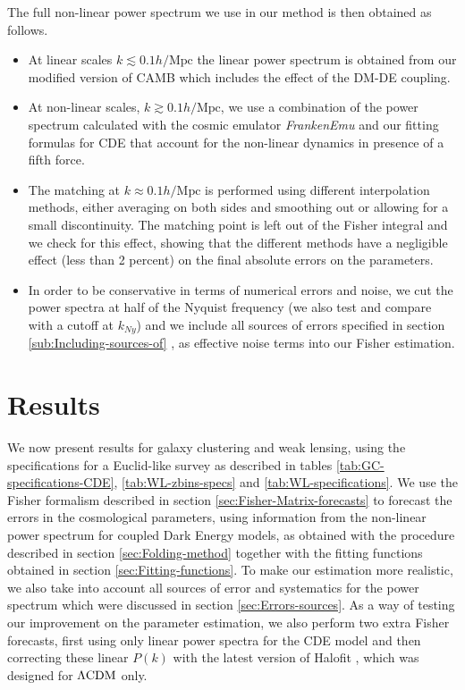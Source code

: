 The full non-linear power spectrum we use in our method is then obtained
as follows. 
\begin{itemize}
\item At linear scales $k\lesssim0.1h/\mbox{Mpc}$ the linear power spectrum
is obtained from our modified version of CAMB which includes the effect
of the DM-DE coupling. 
\item At non-linear scales, $k\gtrsim0.1h/\mbox{Mpc}$, we use a combination
of the power spectrum calculated with the cosmic emulator \emph{FrankenEmu
}and our fitting formulas for CDE that account for the non-linear
dynamics in presence of a fifth force. 
\item The matching at $k\approx0.1h/\mbox{Mpc}$ is performed using different
interpolation methods, either averaging on both sides and smoothing
out or allowing for a small discontinuity. The matching point is left
out of the Fisher integral and we check for this effect, showing that
the different methods have a negligible effect (less than 2 percent)
on the final absolute errors on the parameters. 
\item In order to be conservative in terms of numerical errors and noise,
we cut the power spectra at half of the Nyquist frequency (we also
test and compare with a cutoff at $k_{Ny}$) and we include all sources
of errors specified in section \ref{sub:Including-sources-of} , as
effective noise terms into our Fisher estimation. 
\end{itemize}

\section{\label{sec:GC-WL-Results}Results}

We now present results for galaxy clustering and weak lensing, using
the specifications for a Euclid-like survey as described in tables
\ref{tab:GC-specifications-CDE}, \ref{tab:WL-zbins-specs} and \ref{tab:WL-specifications}.
We use the Fisher formalism described in section \ref{sec:Fisher-Matrix-forecasts}
to forecast the errors in the cosmological parameters, using information
from the non-linear power spectrum for coupled Dark Energy models,
as obtained with the procedure described in section \ref{sec:Folding-method}
together with the fitting functions obtained in section \ref{sec:Fitting-functions}.
To make our estimation more realistic, we also take into account all
sources of error and systematics for the power spectrum which were
discussed in section \ref{sec:Errors-sources}. As a way of testing
our improvement on the parameter estimation, we also perform two extra
Fisher forecasts, first using only linear power spectra for the CDE
model and then correcting these linear $P(k)$ with the latest version
of Halofit \cite{takahashi_revising_2012}, which was designed for
$\Lambda\mathrm{CDM}$ only.

